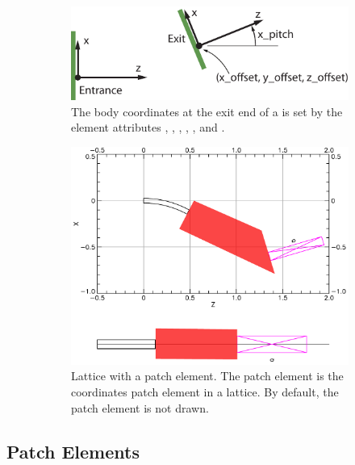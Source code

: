 \documentclass{hitec}
\begin{document}
\begin{figure}[tb]
  \centering
  \begin{subfigure}[b]{0.48\textwidth}
    \includegraphics[width=\textwidth]{patch.pdf}
    \vspace*{5pt}
    \caption{The body coordinates at the exit end of a  is set by the element attributes
, , , , , and .}
    \label{f:patch}
  \end{subfigure}
  \hfil
  \begin{subfigure}[b]{0.48\textwidth}
    \includegraphics[width=\textwidth]{patch-example.pdf}
    \caption{Lattice with a patch element.
The patch element is the coordinates patch element in a lattice. By default, the patch element is not drawn.}
    \label{f:patch.example}
  \end{subfigure}
  \caption{}
\end{figure}

\subsection{Patch Elements}
\label{s:patch}
\end{document}
